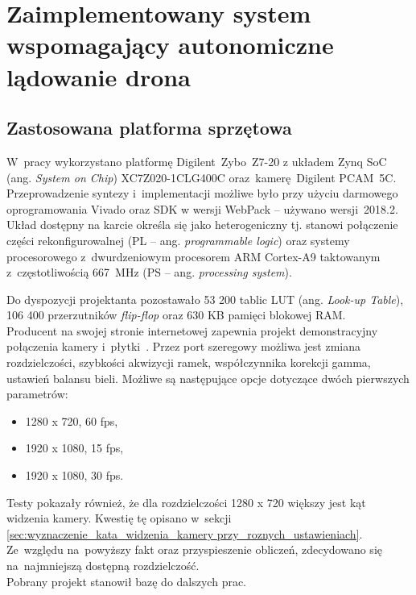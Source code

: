 \chapter{Zaimplementowany system wspomagający autonomiczne lądowanie drona}
\label{cha:opis_implementacji}

\section{Zastosowana platforma sprzętowa}
\label{sec:zastosowana_platforma_sprzetowa}

W~pracy wykorzystano platformę Digilent~Zybo~Z7-20 z układem Zynq SoC (ang. \textit{System on Chip}) XC7Z020-1CLG400C oraz~kamerę~Digilent PCAM~5C. %
Przeprowadzenie syntezy i~implementacji możliwe było przy użyciu darmowego oprogramowania Vivado oraz SDK w wersji WebPack -- używano wersji~2018.2. 
Układ dostępny na karcie określa się jako heterogeniczny tj. stanowi połączenie części rekonfigurowalnej (PL -- ang. \textit{programmable logic}) oraz systemy procesorowego z~dwurdzeniowym procesorem ARM Cortex-A9 taktowanym z~częstotliwością 667~MHz (PS -- ang. \textit{processing system}). 


Do dyspozycji projektanta pozostawało 53 200 tablic LUT (ang. \textit{Look-up Table}), 106 400 przerzutników \textit{flip-flop} oraz 630 KB pamięci blokowej RAM. \\



Producent na swojej stronie internetowej zapewnia projekt demonstracyjny połączenia kamery i~płytki~\cite{projektPCAM}. Przez port szeregowy możliwa jest zmiana rozdzielczości, szybkości akwizycji ramek, współczynnika korekcji gamma, ustawień balansu bieli. Możliwe są następujące opcje dotyczące dwóch pierwszych parametrów:
\begin{itemize}
	\item 1280 x 720, 60 fps,
	\item 1920 x 1080, 15 fps,
	\item 1920 x 1080, 30 fps.
\end{itemize}
Testy pokazały również, że dla rozdzielczości 1280 x 720 większy jest kąt widzenia kamery. Kwestię tę opisano w~sekcji \ref{sec:wyznaczenie_kata_widzenia_kamery przy_roznych_ustawieniach}. Ze~względu na~powyższy fakt oraz przyspieszenie obliczeń, zdecydowano się na~najmniejszą dostępną rozdzielczość.\\
Pobrany projekt stanowił bazę do dalszych prac. 


